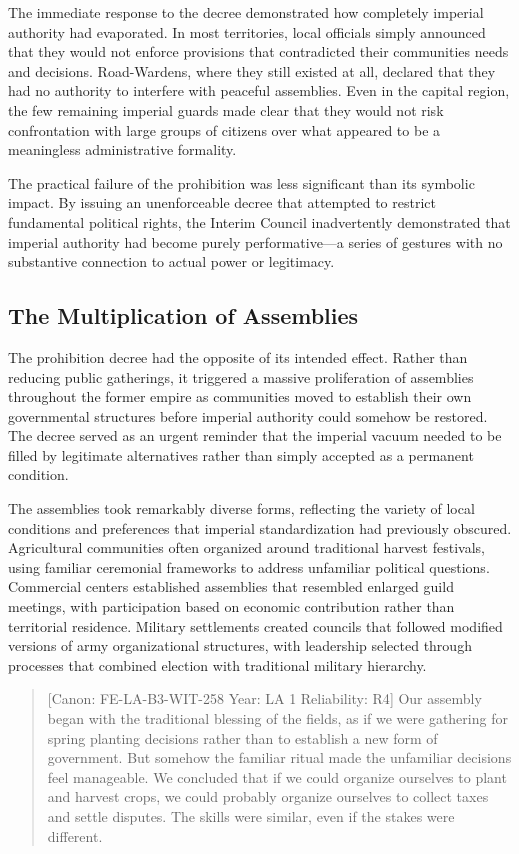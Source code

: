 The immediate response to the decree demonstrated how completely
imperial authority had evaporated. In most territories, local officials
simply announced that they would not enforce provisions that
contradicted their communities\textquotesingle{} needs and decisions.
Road-Wardens, where they still existed at all, declared that they had no
authority to interfere with peaceful assemblies. Even in the capital
region, the few remaining imperial guards made clear that they would not
risk confrontation with large groups of citizens over what appeared to
be a meaningless administrative formality.

The practical failure of the prohibition was less significant than its
symbolic impact. By issuing an unenforceable decree that attempted to
restrict fundamental political rights, the Interim Council inadvertently
demonstrated that imperial authority had become purely performative---a
series of gestures with no substantive connection to actual power or
legitimacy.

\subsection{The Multiplication of
Assemblies}\label{the-multiplication-of-assemblies}

The prohibition decree had the opposite of its intended effect. Rather
than reducing public gatherings, it triggered a massive proliferation of
assemblies throughout the former empire as communities moved to
establish their own governmental structures before imperial authority
could somehow be restored. The decree served as an urgent reminder that
the imperial vacuum needed to be filled by legitimate alternatives
rather than simply accepted as a permanent condition.

The assemblies took remarkably diverse forms, reflecting the variety of
local conditions and preferences that imperial standardization had
previously obscured. Agricultural communities often organized around
traditional harvest festivals, using familiar ceremonial frameworks to
address unfamiliar political questions. Commercial centers established
assemblies that resembled enlarged guild meetings, with participation
based on economic contribution rather than territorial residence.
Military settlements created councils that followed modified versions of
army organizational structures, with leadership selected through
processes that combined election with traditional military hierarchy.

\begin{quote}
{[}Canon: FE-LA-B3-WIT-258 \textbar{} Year: LA 1 \textbar{} Reliability:
R4{]} Our assembly began with the traditional blessing of the fields, as
if we were gathering for spring planting decisions rather than to
establish a new form of government. But somehow the familiar ritual made
the unfamiliar decisions feel manageable. We concluded that if we could
organize ourselves to plant and harvest crops, we could probably
organize ourselves to collect taxes and settle disputes. The skills were
similar, even if the stakes were different.
\end{quote}

